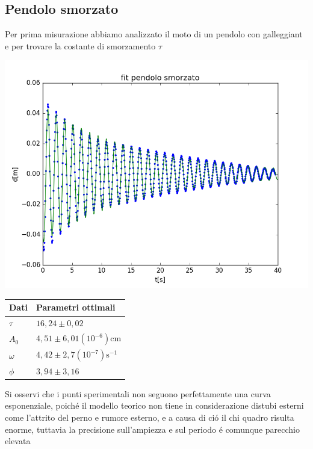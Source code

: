 \documentclass{exam}
\begin{document}
		\subsection{Pendolo smorzato}
			Per prima misurazione abbiamo analizzato il moto di un pendolo con galleggiant	e per trovare la costante di smorzamento $\tau$ \\
			\begin{minipage}{0.5\textwidth}
				\includegraphics[width=\textwidth]{fit_smorzato}
				\end{minipage}
			\begin{minipage}{0.5\textwidth}
				\begin{tabular}{ll}
					\toprule
					Dati & Parametri ottimali \\
					\midrule
					$\tau$ & $16,24 \pm 0,02$ \\
					$A_{0}$ & $4,51 \pm 6,01(10^{-6})$cm\\
					$\omega$ & $4,42 \pm 2,7(10^{-7})\textrm{s}^{-1}$\\			
					$\phi$ & $3,94 \pm 3,16$\\
					\bottomrule

				\end{tabular}
			\end{minipage}
			Si osservi che i punti sperimentali non seguono perfettamente una curva esponenziale, poich\'e il modello teorico non tiene in considerazione distubi esterni come l'attrito del perno e rumore esterno, e a causa di ci\'o il chi quadro risulta enorme, tuttavia la precisione sull'ampiezza e sul periodo \'e comunque parecchio elevata
\end{document}
